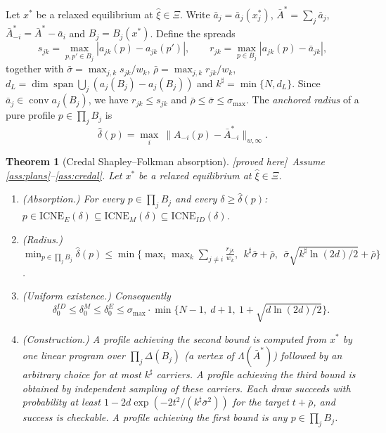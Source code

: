 \documentclass[11pt]{article}
\newtheorem{theorem}{Theorem}[section]
\theoremstyle{definition}
\theoremstyle{remark}
\newcommand{\abar}{\bar a}
\newcommand{\Abar}{\bar A}
\newcommand{\conv}{\operatorname{conv}}
\newcommand{\spn}{\operatorname{span}}
\newcommand{\ICNE}{\mathrm{ICNE}}
\newcommand{\PROVED}{\textsf{[proved here]}}
\begin{document}
Let $x^*$ be a relaxed equilibrium at $\hat\xi\in\Xi$. Write $\abar_j=\abar_j(x_j^*)$, $\Abar^*=\sum_j\abar_j$, $\Abar^*_{-i}=\Abar^*-\abar_i$ and $B_j=B_j(x^*)$. Define the spreads
\[s_{jk}=\max_{p,p'\in B_j}|a_{jk}(p)-a_{jk}(p')|,\qquad r_{jk}=\max_{p\in B_j}|a_{jk}(p)-\abar_{jk}|,\]
together with $\bar\sigma=\max_{j,k}s_{jk}/w_k$, $\bar\rho=\max_{j,k}r_{jk}/w_k$, $d_L=\dim\spn\bigcup_j(a_j(B_j)-a_j(B_j))$ and $k^\sharp=\min\{N,d_L\}$. Since $\abar_j\in\conv a_j(B_j)$, we have $r_{jk}\le s_{jk}$ and $\bar\rho\le\bar\sigma\le\sigma_{\max}$. The \emph{anchored radius} of a pure profile $p\in\prod_jB_j$ is
\[\hat\delta(p)=\max_i\ \|A_{-i}(p)-\Abar^*_{-i}\|_{w,\infty}.\]

\begin{theorem}[Credal Shapley--Folkman absorption]\label{thm:main} \PROVED\
Assume \ref{ass:plans}--\ref{ass:credal}. Let $x^*$ be a relaxed equilibrium at $\hat\xi\in\Xi$.
\begin{enumerate}[label=(\alph*)]
\item \emph{(Absorption.)} For every $p\in\prod_jB_j$ and every $\delta\ge\hat\delta(p)$:
$p\in\ICNE_E(\delta)\subseteq\ICNE_M(\delta)\subseteq\ICNE_{ID}(\delta)$.
\item \emph{(Radius.)} $\min_{p\in\prod_jB_j}\hat\delta(p)\le\min\Big\{\max_i\max_k\sum_{j\ne i}\frac{r_{jk}}{w_k},\ \ k^\sharp\bar\sigma+\bar\rho,\ \ \bar\sigma\sqrt{k^\sharp\ln(2d)/2}+\bar\rho\Big\}$.
\item \emph{(Uniform existence.)} Consequently
\[\delta_0^{ID}\le\delta_0^M\le\delta_0^E\le\sigma_{\max}\cdot\min\Big\{N-1,\ d+1,\ 1+\sqrt{d\ln(2d)/2}\Big\}.\]
\item \emph{(Construction.)} A profile achieving the second bound is computed from $x^*$ by one linear program over $\prod_j\Delta(B_j)$ (a vertex of $\Lambda(\Abar^*)$) followed by an arbitrary choice for at most $k^\sharp$ carriers. A profile achieving the third bound is obtained by independent sampling of these carriers. Each draw succeeds with probability at least $1-2d\exp(-2t^2/(k^\sharp\bar\sigma^2))$ for the target $t+\bar\rho$, and success is checkable. A profile achieving the first bound is any $p\in\prod_jB_j$.
\end{enumerate}
\end{theorem}
\end{document}
